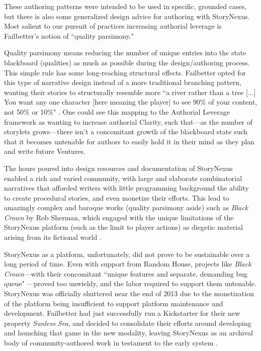 
These authoring patterns were intended to be used in specific, grounded cases, but there is also some generalized design advice for authoring with StoryNexus. Most salient to our pursuit of practices increasing authorial leverage is Failbetter's notion of ``quality parsimony."

Quality parsimony means reducing the number of unique entries into the state blackboard (qualities) as much as possible during the design/authoring process. This simple rule has some long-reaching structural effects. Failbetter opted for this type of narrative design instead of a more traditional branching pattern, wanting their stories to structurally resemble more ``a river rather than a tree [...] You want any one character [here meaning the player] to see 90\% of your content, not 50\% or 10\%" \cite{arendt_structuresThree}. One could see this mapping to the Authorial Leverage framework as wanting to increase authorial Clarity, such that---as the number of storylets grows---there isn't a concomitant growth of the blackboard state such that it  becomes untenable for authors to easily hold it in their mind as they plan and write future Ventures.

The hours poured into design resources and documentation of StoryNexus enabled a rich and varied community, with large and elaborate combinatorial narratives that afforded writers with little programming background the ability to create procedural stories, and even monetize their efforts. This lead to amazingly complex and baroque works (quality parsimony aside) such as \textit{Black Crown} by Rob Sherman, which engaged with the unique limitations of the StoryNexus platform (such as the limit to player actions) as diegetic material arising from its fictional world \cite{reed_blackCrown}.

StoryNexus as a platform, unfortunately, did not prove to be sustainable over a long period of time. Even with support from Random House, projects like \textit{Black Crown}---with their concomitant ``unique features and separate, demanding bug queue" \cite{sherman_2014}---proved too unwieldy, and the labor required to support them untenable. StoryNexus was officially shuttered near the end of 2013 due to the monetization of the platform being insufficient to support platform maintenance and development. Failbetter had just successfully run a Kickstarter for their new property \textit{Sunless Sea}, and decided to consolidate their efforts around developing and launching that game in the new modality, leaving StoryNexus as an archival body of community-authored work in testament to the early system \cite{kennedy_2013}.

